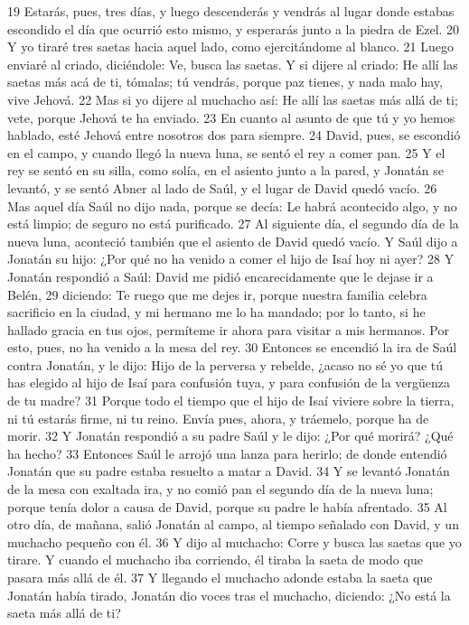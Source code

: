 19 Estarás, pues, tres días, y luego descenderás y vendrás al lugar donde estabas escondido el día que ocurrió esto mismo, y esperarás junto a la piedra de Ezel.
20 Y yo tiraré tres saetas hacia aquel lado, como ejercitándome al blanco.
21 Luego enviaré al criado, diciéndole: Ve, busca las saetas. Y si dijere al criado: He allí las saetas más acá de ti, tómalas; tú vendrás, porque paz tienes, y nada malo hay, vive Jehová.
22 Mas si yo dijere al muchacho así: He allí las saetas más allá de ti; vete, porque Jehová te ha enviado.
23 En cuanto al asunto de que tú y yo hemos hablado, esté Jehová entre nosotros dos para siempre.
24 David, pues, se escondió en el campo, y cuando llegó la nueva luna, se sentó el rey a comer pan.
25 Y el rey se sentó en su silla, como solía, en el asiento junto a la pared, y Jonatán se levantó, y se sentó Abner al lado de Saúl, y el lugar de David quedó vacío.
26 Mas aquel día Saúl no dijo nada, porque se decía: Le habrá acontecido algo, y no está limpio; de seguro no está purificado.
27 Al siguiente día, el segundo día de la nueva luna, aconteció también que el asiento de David quedó vacío. Y Saúl dijo a Jonatán su hijo: ¿Por qué no ha venido a comer el hijo de Isaí hoy ni ayer?
28 Y Jonatán respondió a Saúl: David me pidió encarecidamente que le dejase ir a Belén,
29 diciendo: Te ruego que me dejes ir, porque nuestra familia celebra sacrificio en la ciudad, y mi hermano me lo ha mandado; por lo tanto, si he hallado gracia en tus ojos, permíteme ir ahora para visitar a mis hermanos. Por esto, pues, no ha venido a la mesa del rey.
30 Entonces se encendió la ira de Saúl contra Jonatán, y le dijo: Hijo de la perversa y rebelde, ¿acaso no sé yo que tú has elegido al hijo de Isaí para confusión tuya, y para confusión de la vergüenza de tu madre?
31 Porque todo el tiempo que el hijo de Isaí viviere sobre la tierra, ni tú estarás firme, ni tu reino. Envía pues, ahora, y tráemelo, porque ha de morir.
32 Y Jonatán respondió a su padre Saúl y le dijo: ¿Por qué morirá? ¿Qué ha hecho?
33 Entonces Saúl le arrojó una lanza para herirlo; de donde entendió Jonatán que su padre estaba resuelto a matar a David.
34 Y se levantó Jonatán de la mesa con exaltada ira, y no comió pan el segundo día de la nueva luna; porque tenía dolor a causa de David, porque su padre le había afrentado.
35 Al otro día, de mañana, salió Jonatán al campo, al tiempo señalado con David, y un muchacho pequeño con él.
36 Y dijo al muchacho: Corre y busca las saetas que yo tirare. Y cuando el muchacho iba corriendo, él tiraba la saeta de modo que pasara más allá de él.
37 Y llegando el muchacho adonde estaba la saeta que Jonatán había tirado, Jonatán dio voces tras el muchacho, diciendo: ¿No está la saeta más allá de ti?
